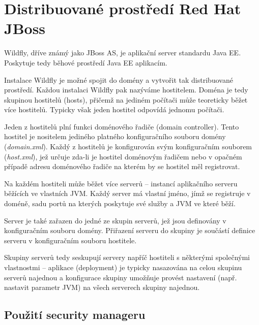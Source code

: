 \chapter{Distribuované prostředí Red Hat JBoss}

Wildfly, dříve známý jako JBoss AS, je aplikační server standardu Java EE. Poskytuje tedy běhové prostředí Java EE aplikacím.

Instalace Wildfly je možné spojit do domény a vytvořit tak distribuované prostředí. Každou instalaci Wildfly pak nazýváme hostitelem. Doména je tedy skupinou hostitelů (hosts), přičemž na jediném počítači může teoreticky běžet více hostitelů. Typicky však jeden hostitel odpovídá jednomu počítači.

Jeden z hostitelů plní funkci doménového řadiče (domain controller). Tento hostitel je nositelem jediného platného konfiguračního souboru domény ({\it domain.xml}). Každý z hostitelů je konfigurován svým konfiguračním souborem ({\it host.xml}), jež určuje zda-li je hostitel doménovým řadičem nebo v opačném případě adresu doménového řadiče na kterém by se hostitel měl registrovat. \cite{jbossDomainSetup}

Na každém hostiteli může běžet více serverů -- instancí aplikačního serveru běžících ve vlastních JVM. Každý server má vlastní jméno, jímž se registruje v doméně, sadu portů na kterých poskytuje své služby a JVM ve které běží. \cite{jbossDomainSetup}

Server je také zařazen do jedné ze skupin serverů, jež jsou definovány v konfiguračním souboru domény. Přiřazení serveru do skupiny je součástí definice serveru v konfiguračním souboru hostitele. \cite{jbossDomainSetup}

Skupiny serverů tedy seskupují servery napříč hostiteli s některými společnými vlastnostmi -- aplikace (deployment) je typicky nasazována na celou skupinu serverů najednou a konfigurace skupiny umožňuje provést nastavení (např. nastavit parametr JVM) na všech serverech skupiny najednou. \cite{jbossDomainSetup}

\section{Použití security manageru}

